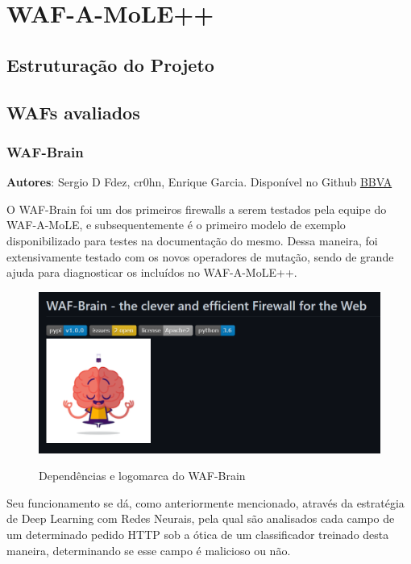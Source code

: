 \chapter{WAF-A-MoLE++}
\label{chp:capitulo4}

\section{Estruturação do Projeto}

\section{WAFs avaliados}

\subsection{WAF-Brain}

\textbf{Autores}: Sergio D Fdez, cr0hn, Enrique Garcia. Disponível no Github \href{https://github.com/BBVA}{BBVA}

O WAF-Brain foi um dos primeiros firewalls a serem testados pela equipe do WAF-A-MoLE, e subsequentemente é o primeiro modelo de exemplo disponibilizado para testes na documentação do mesmo. Dessa maneira, foi extensivamente testado com os novos operadores de mutação, sendo de grande ajuda para diagnosticar os incluídos no WAF-A-MoLE++.

\begin{figure}[ht]
    \centering
    \caption{Dependências e logomarca do WAF-Brain}
    \includegraphics[width=12.5cm]{figuras/WAFBrain.png} 
    \label{fig:internet} 
\end{figure}

Seu funcionamento se dá, como anteriormente mencionado, através da estratégia de Deep Learning com Redes Neurais, pela qual são analisados cada campo de um determinado pedido HTTP sob a ótica de um classificador treinado desta maneira, determinando se esse campo é malicioso ou não.

